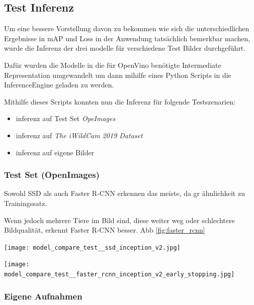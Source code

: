 \subsection{Test Inferenz}\label{sec:test_inferenz}

Um eine bessere Vorstellung davon zu bekommen wie sich die 
unterschiedlichen Ergebnisse in mAP und Loss in der Anwendung 
tatsächlich bemerkbar machen, wurde die Inferenz der drei modelle 
für verschiedene Test Bilder durchgeführt.

Dafür wurden die Modelle in die für OpenVino benötigte Intermediate
Representation umgewandelt um dann mihilfe eines Python 
Scripts in die InferenceEngine geladen zu werden.

Mithilfe dieses Scripts konnten nun die Inferenz für 
folgende Testszenarien:

\begin{itemize}
  \item inferenz auf Test Set \textit{OpeImages}
  \item inferenz auf \textit{The iWildCam 2019 Dataset}\cite{beery2019iwildcam}
  \item inferenz auf eigene Bilder
\end{itemize}


\subsubsection{Test Set (OpenImages)}
Sowohl SSD als auch Faster R-CNN erkennen das meiste, da gr 
ähnlichkeit zu Trainingssatz.

Wenn jedoch mehrere Tiere im Bild sind, diese weiter weg oder schlechtere
Bildqualität, erkennt Faster R-CNN besser. Abb \ref{fig:faster_rcnn}
\\[1cm]
\begin{minipage}{0.5\textwidth}
  \centering
  \texttt{[image: model\_compare\_test\_\_ssd\_inception\_v2.jpg]}
  \label{fig:ssd}
\end{minipage}
\begin{minipage}{0.5\textwidth}
  \centering
  \texttt{[image: model\_compare\_test\_\_faster\_rcnn\_inception\_v2\_early\_stopping.jpg]}
  \label{fig:faster_rcnn}
\end{minipage}


\subsubsection{Eigene Aufnahmen}


